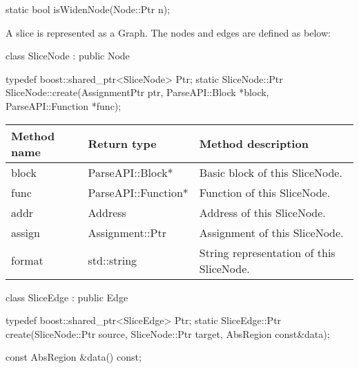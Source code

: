 \begin{apient}
static bool isWidenNode(Node::Ptr n);
\end{apient}

A slice is represented as a Graph. The nodes and edges are defined as below:

\begin{apient}
class SliceNode : public Node
\end{apient}

\begin{apient}
typedef boost::shared_ptr<SliceNode> Ptr;      
static SliceNode::Ptr SliceNode::create(AssignmentPtr ptr,
                                        ParseAPI::Block *block,
					ParseAPI::Function *func);
\end{apient}

\begin{tabular}{p{1.25in}p{1.125in}p{3.125in}}
\toprule
Method name & Return type & Method description \\
\midrule
block & ParseAPI::Block* & Basic block of this SliceNode. \\
func & ParseAPI::Function* & Function of this SliceNode. \\
addr & Address & Address of this SliceNode. \\
assign & Assignment::Ptr & Assignment of this SliceNode. \\
format & std::string & String representation of this SliceNode.\\
\bottomrule
\end{tabular}


\begin{apient}
class SliceEdge : public Edge 
\end{apient}

\begin{apient}
typedef boost::shared_ptr<SliceEdge> Ptr;
static SliceEdge::Ptr create(SliceNode::Ptr source,
                             SliceNode::Ptr target,
			     AbsRegion const&data);
\end{apient}

\begin{apient}
const AbsRegion &data() const;
\end{apient}

